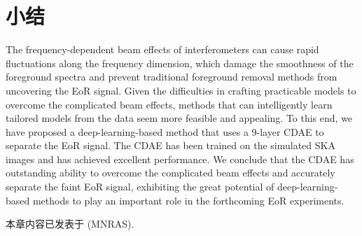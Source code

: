 \section{小结}

The frequency-dependent beam effects of interferometers can cause
rapid fluctuations along the frequency dimension,
which damage the smoothness of the foreground spectra and prevent
traditional foreground removal methods from uncovering the EoR signal.
Given the difficulties in crafting practicable models to overcome the
complicated beam effects, methods that can intelligently learn tailored
models from the data seem more feasible and appealing.
To this end, we have proposed a deep-learning-based method that uses
a 9-layer CDAE to separate the EoR signal.
The CDAE has been trained on the simulated SKA images and has achieved
excellent performance.
We conclude that the CDAE has outstanding ability to overcome the
complicated beam effects and accurately separate the faint EoR signal,
exhibiting the great potential of deep-learning-based methods
to play an important role in the forthcoming EoR experiments.

本章内容已发表于 \mnras{} (MNRAS).


